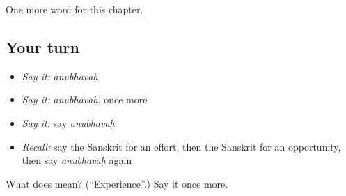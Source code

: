 \begin{grammarlens}[title={What you've built}]
One more word for this chapter.
\end{grammarlens}

\subsection*{Your turn}
\begin{itemize}
\raggedright
  \item \emph{Say it:} \emph{anubhavaḥ}
  \item \emph{Say it:} \emph{anubhavaḥ}, once more
  \item \emph{Say it:} say \emph{anubhavaḥ}
  \item \emph{Recall:} say the Sanskrit for an effort, then the Sanskrit for an opportunity, then say \emph{anubhavaḥ} again
\end{itemize}

\begin{tcolorbox}[breakable,colback=teal!4,colframe=teal!35!black,title={Before you move on}]
What does  mean? (\textquotedblleft{}Experience\textquotedblright{}.) Say it once more.
\end{tcolorbox}
